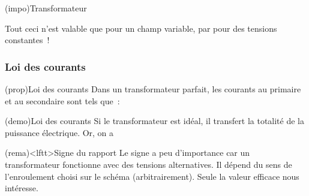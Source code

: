 \documentclass[../../main/main.tex]{subfiles}
\begin{document}
\begin{tcb*}(impo){Transformateur}
	\begin{center}
		Tout ceci n'est valable que pour un champ variable, par pour des tensions
		constantes~!
	\end{center}
\end{tcb*}

\subsubsection{Loi des courants}
\label{sssec:label}

\begin{tcb*}(prop){Loi des courants}
	Dans un transformateur parfait, les courants au primaire et au secondaire sont
	tels que~:
	\psw{%
		\[
			\boxed{\frac{i_2 (t)}{i_1 (t)} = - \frac{N_1}{N_2} = -\frac{1}{m}}
		\]
	}%
\end{tcb*}

\begin{tcb*}(demo){Loi des courants}
	Si le transformateur est idéal, il transfert la totalité de la puissance électrique. Or, on a
\end{tcb*}

\begin{tcb}(rema)<lftt>{Signe du rapport}
	Le signe a peu d'importance car un transformateur fonctionne avec des tensions
	alternatives. Il dépend du sens de l'enroulement choisi sur le schéma
	(arbitrairement). Seule la valeur efficace nous intéresse.
\end{tcb}
\end{document}
